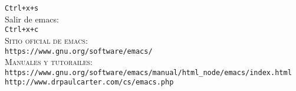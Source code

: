 \documentclass[12pt]{article}
\begin{document}
\texttt{Ctrl+x+s}\\

Salir de emacs:\\

\texttt{Ctrl+x+c}\\

\textsc{Sitio oficial de emacs:}\\
\verb"https://www.gnu.org/software/emacs/"\\

\textsc{Manuales y tutorailes:}\\
\verb"https://www.gnu.org/software/emacs/manual/html_node/emacs/index.html"\\
\verb"http://www.drpaulcarter.com/cs/emacs.php"\\
\end{document}

